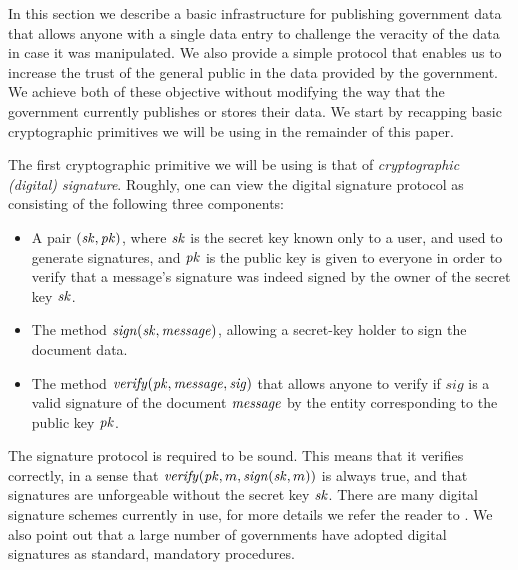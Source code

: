 
In this section we describe a basic infrastructure for publishing government data that allows anyone with a single data entry to challenge the veracity of the data in case it was manipulated. We also provide a simple protocol that enables us to increase the trust of the general public in the data provided by the government. We achieve both of these objective without modifying the way that the government currently publishes or stores their data. We start by recapping basic cryptographic primitives we will be using in the remainder of this paper.

\medskip
{} The first cryptographic primitive we will be using is that of {\em cryptographic (digital) signature}. Roughly, one can view the digital signature protocol as consisting of the following three components: 
\begin{itemize}
\item A pair $(\mathit{sk},\mathit{pk})$, where $\mathit{sk}$ is the secret key known only to a user, and used to generate signatures, and $\mathit{pk}$ is the public key is given to everyone in order to verify that a message's signature was indeed signed by the owner of the secret key $\mathit{sk}$.
\item The method $\mathit{sign}(\mathit{sk},\mathit{message})$, allowing a secret-key holder to sign the document data. 
\item The method $\mathit{verify}(\mathit{pk},\mathit{message},\mathit{sig})$ that allows anyone to verify if $\mathit{sig}$ is a valid signature of the document $\mathit{message}$ by the entity corresponding to the public key $\mathit{pk}$.
\end{itemize}
The signature protocol is required to be sound. This means that it verifies correctly, in a sense that $\mathit{verify}(\mathit{pk},m,\mathit{sign}(\mathit{sk},m))$ is always true, and that signatures are unforgeable without the secret key $\mathit{sk}$. There are many digital signature schemes currently in use, for more details we refer the reader to \cite{KatzLindell2014}. We also point out that a large number of governments have adopted digital signatures as standard, mandatory procedures.

